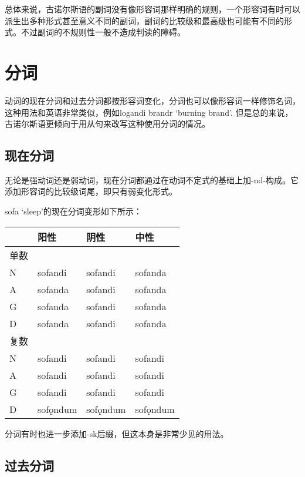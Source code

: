 总体来说，古诺尔斯语的副词没有像形容词那样明确的规则，一个形容词有时可以派生出多种形式甚至意义不同的副词，副词的比较级和最高级也可能有不同的形式。不过副词的不规则性一般不造成判读的障碍。

\section{分词}\label{分词}

动词的现在分词和过去分词都按形容词变化，分词也可以像形容词一样修饰名词，这种用法和英语非常类似，例如logandi
brandr `burning brand‌'.
但是总的来说，古诺尔斯语更倾向于用从句来改写这种使用分词的情况。

\subsection{现在分词}\label{现在分词}

无论是强动词还是弱动词，现在分词都通过在动词不定式的基础上加-nd-构成。它添加形容词的比较级词尾，即只有弱变化形式。

sofa `sleep‌'的现在分词变形如下所示：

\begin{longtable}{llll}
  \toprule
     & 阳性       & 阴性       & 中性       \\
  \midrule
  \endhead
  \bottomrule
  \endfoot
  单数 &          &          &          \\
  N  & sofandi  & sofandi  & sofanda  \\
  A  & sofanda  & sofandi  & sofanda  \\
  G  & sofanda  & sofandi  & sofanda  \\
  D  & sofanda  & sofandi  & sofanda  \\
  复数 &          &          &          \\
  N  & sofandi  & sofandi  & sofandi  \\
  A  & sofandi  & sofandi  & sofandi  \\
  G  & sofandi  & sofandi  & sofandi  \\
  D  & sofǫndum & sofǫndum & sofǫndum \\
\end{longtable}

分词有时也进一步添加-sk后缀，但这本身是非常少见的用法。

\subsection{过去分词}\label{过去分词}

